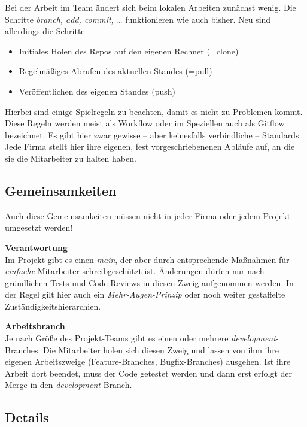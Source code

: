 \documentclass[
  letterpaper,
  DIV=11]{scrreprt}
\providecommand{\tightlist}{%
  \setlength{\itemsep}{0pt}\setlength{\parskip}{0pt}}\usepackage{longtable,booktabs,array}
\newcommand{\branch}[1]{\textit{#1}\xspace}
\begin{document}
Bei der Arbeit im Team ändert sich beim lokalen Arbeiten zunächst wenig.
Die Schritte \emph{branch, add, commit, \ldots{}} funktionieren wie auch
bisher. Neu sind allerdings die Schritte

\begin{itemize}
\tightlist
\item
  Initiales Holen des Repos auf den eigenen Rechner (=clone)
\item
  Regelmäßiges Abrufen des aktuellen Standes (=pull)
\item
  Veröffentlichen des eigenen Standes (push)
\end{itemize}

Hierbei sind einige Spielregeln zu beachten, damit es nicht zu Problemen
kommt. Diese Regeln werden meist als Workflow oder im Speziellen auch
als Gitflow bezeichnet. Es gibt hier zwar gewisse -- aber keinesfalls
verbindliche -- Standards. Jede Firma stellt hier ihre eigenen, fest
vorgeschriebenenen Abläufe auf, an die sie die Mitarbeiter zu halten
haben.

\subsection{Gemeinsamkeiten}\label{gemeinsamkeiten}

Auch diese Gemeinsamkeiten müssen nicht in jeder Firma oder jedem
Projekt umgesetzt werden!

\textbf{Verantwortung}\\
Im Projekt gibt es einen \branch{main}, der aber durch entsprechende
Maßnahmen für \emph{einfache} Mitarbeiter schreibgeschützt ist.
Änderungen dürfen nur nach gründlichen Tests und Code-Reviews in diesen
Zweig aufgenommen werden. In der Regel gilt hier auch ein
\emph{Mehr-Augen-Prinzip} oder noch weiter gestaffelte
Zuständigkeitshierarchien.

\textbf{Arbeitsbranch}\\
Je nach Größe des Projekt-Teams gibt es einen oder mehrere
\branch{development}-Branches. Die Mitarbeiter holen sich diesen Zweig
und lassen von ihm ihre eigenen Arbeitszweige (Feature-Branches,
Bugfix-Branches) ausgehen. Ist ihre Arbeit dort beendet, muss der Code
getestet werden und dann erst erfolgt der Merge in den
\branch{development}-Branch.

\subsection{Details}\label{details}
\end{document}
